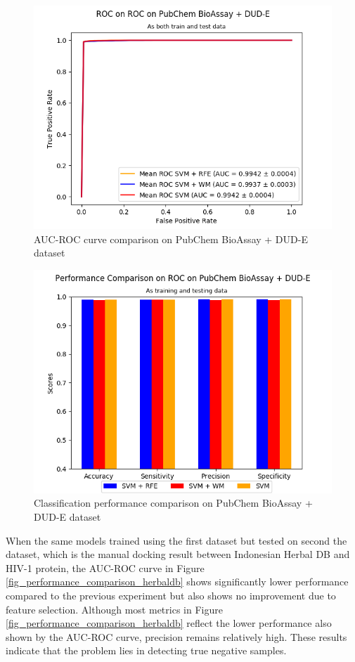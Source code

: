 \documentclass[conference,compsoc,12pt]{IEEEtran}
\begin{document}
	\begin{figure}
		\includegraphics[scale=0.5]{../images/03-evaluate-1_roc_chart.png}
		\caption{AUC-ROC curve comparison on PubChem BioAssay + DUD-E dataset}
		\label{fig_roc_comparison_pubchem}
	\end{figure}
	
	\begin{figure}
		\includegraphics[scale=0.5]{../images/03-evaluate-1_scores_chart.png}
		\caption{Classification performance comparison on PubChem BioAssay + DUD-E dataset}
		\label{fig_performance_comparison_pubchem}
	\end{figure}
	
	When the same models trained using the first dataset but tested on second the dataset, which is the manual docking result between Indonesian Herbal DB and HIV-1 protein, the AUC-ROC curve in Figure \ref{fig_performance_comparison_herbaldb} shows significantly lower performance compared to the previous experiment but also shows no improvement due to feature selection. Although most metrics in Figure \ref{fig_performance_comparison_herbaldb} reflect the lower performance also shown by the AUC-ROC curve, precision remains relatively high. These results indicate that the problem lies in detecting true negative samples.
\end{document}
